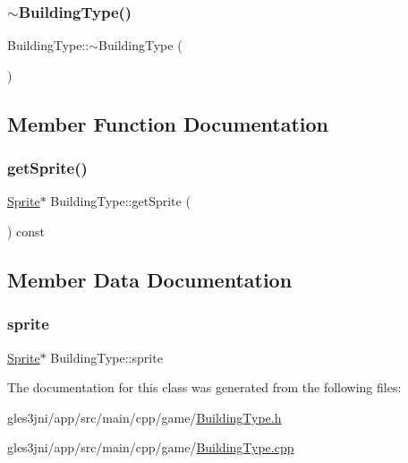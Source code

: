 \mbox{\label{class_building_type_ab307f939c2dfa1ec9732e369932aa601}} 
\subsubsection{\texorpdfstring{$\sim$\+Building\+Type()}{~BuildingType()}}
{\footnotesize\ttfamily Building\+Type\+::$\sim$\+Building\+Type (\begin{DoxyParamCaption}{ }\end{DoxyParamCaption})}



\subsection{Member Function Documentation}
\mbox{\label{class_building_type_a1e5e9337b34369ea7ccb9bfded67f7a1}} 
\subsubsection{\texorpdfstring{get\+Sprite()}{getSprite()}}
{\footnotesize\ttfamily \hyperlink{class_sprite}{Sprite}$\ast$ Building\+Type\+::get\+Sprite (\begin{DoxyParamCaption}{ }\end{DoxyParamCaption}) const\hspace{0.3cm}{\ttfamily [inline]}}



\subsection{Member Data Documentation}
\mbox{\label{class_building_type_a478ebad17c32cae3c5def69b87b7d898}} 
\subsubsection{\texorpdfstring{sprite}{sprite}}
{\footnotesize\ttfamily \hyperlink{class_sprite}{Sprite}$\ast$ Building\+Type\+::sprite\hspace{0.3cm}{\ttfamily [private]}}



The documentation for this class was generated from the following files\+:\begin{DoxyCompactItemize}
\item 
gles3jni/app/src/main/cpp/game/\hyperlink{_building_type_8h}{Building\+Type.\+h}\item 
gles3jni/app/src/main/cpp/game/\hyperlink{_building_type_8cpp}{Building\+Type.\+cpp}\end{DoxyCompactItemize}
